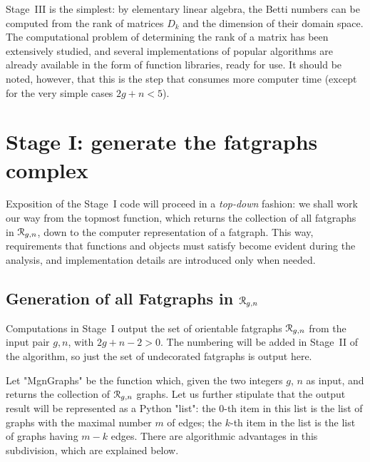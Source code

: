 Stage~III is the simplest: by elementary linear algebra, the Betti
numbers can be computed from the rank of matrices $D_k$ and the
dimension of their domain space.  The computational problem of
determining the rank of a matrix has been extensively studied, and
several implementations of popular algorithms are already available in
the form of function libraries, ready for use. It should be noted,
however, that this is the step that consumes more computer time
(except for the very simple cases $2g+n<5$).

\section[Stage I]{Stage I: generate the fatgraphs complex}
\label{sec:stage-i}

Exposition of the Stage~I code will proceed in a \emph{top-down}
fashion: we shall work our way from the topmost function, which
returns the collection of all fatgraphs in $\mathcal{R}_{g,n}$, down to the
computer representation of a fatgraph.  This way, requirements that
functions and objects must satisfy become evident during the analysis,
and implementation details are introduced only when needed.

\subsection{Generation of all Fatgraphs in $\mathcal{R}_{g,n}$}
\label{sec:stage1-all}

Computations in Stage~I output the set of orientable fatgraphs
$\mathcal{R}_{g,n}$ from the input pair $g, n$, with $2g +n - 2 > 0$.  The
numbering will be added in Stage~II of the algorithm, so just the set
of undecorated fatgraphs is output here.

Let "MgnGraphs" be the function which, given the two integers $g$,
$n$ as input, and returns the collection of $\mathcal{R}_{g,n}$ graphs.  Let us
further stipulate that the output result will be represented as a
Python "list": the $0$-th item in this list is the list of graphs
with the maximal number $m$ of edges; the $k$-th item in the list is
the list of graphs having $m - k$ edges.  There are algorithmic
advantages in this subdivision, which are explained below.


